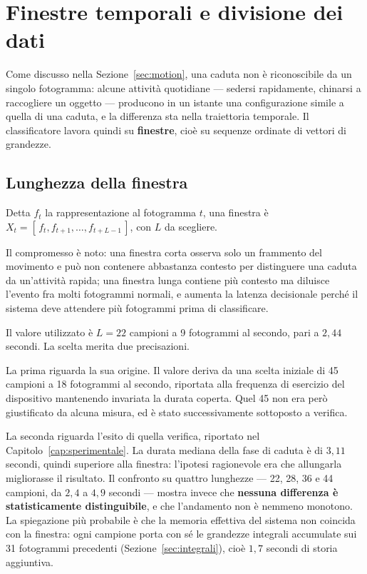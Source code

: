 
\section{Finestre temporali e divisione dei dati}
\label{sec:finestre}

Come discusso nella Sezione~\ref{sec:motion}, una caduta non è riconoscibile da
un singolo fotogramma: alcune attività quotidiane — sedersi rapidamente,
chinarsi a raccogliere un oggetto — producono in un istante una configurazione
simile a quella di una caduta, e la differenza sta nella traiettoria temporale.
Il classificatore lavora quindi su \textbf{finestre}, cioè su sequenze ordinate
di vettori di grandezze.

\subsection{Lunghezza della finestra}

Detta $f_t$ la rappresentazione al fotogramma $t$, una finestra è
$X_t = [\,f_t, f_{t+1}, \dots, f_{t+L-1}\,]$, con $L$ da scegliere.

Il compromesso è noto: una finestra corta osserva solo un frammento del
movimento e può non contenere abbastanza contesto per distinguere una caduta da
un'attività rapida; una finestra lunga contiene più contesto ma diluisce
l'evento fra molti fotogrammi normali, e aumenta la latenza decisionale perché
il sistema deve attendere più fotogrammi prima di classificare.

Il valore utilizzato è $L = 22$ campioni a 9 fotogrammi al secondo, pari a
$2{,}44$ secondi. La scelta merita due precisazioni.

La prima riguarda la sua origine. Il valore deriva da una scelta iniziale di 45
campioni a 18 fotogrammi al secondo, riportata alla frequenza di esercizio del
dispositivo mantenendo invariata la durata coperta. Quel 45 non era però
giustificato da alcuna misura, ed è stato successivamente sottoposto a
verifica.

La seconda riguarda l'esito di quella verifica, riportato nel
Capitolo~\ref{cap:sperimentale}. La durata mediana della fase di caduta è di
$3{,}11$ secondi, quindi superiore alla finestra: l'ipotesi ragionevole era che
allungarla migliorasse il risultato. Il confronto su quattro lunghezze — 22, 28,
36 e 44 campioni, da $2{,}4$ a $4{,}9$ secondi — mostra invece che
\textbf{nessuna differenza è statisticamente distinguibile}, e che l'andamento
non è nemmeno monotono. La spiegazione più probabile è che la memoria effettiva
del sistema non coincida con la finestra: ogni campione porta con sé le
grandezze integrali accumulate sui 31 fotogrammi precedenti
(Sezione~\ref{sec:integrali}), cioè $1{,}7$ secondi di storia aggiuntiva.

